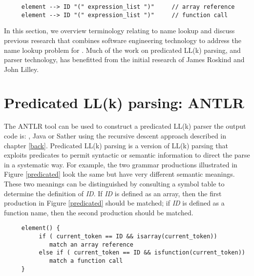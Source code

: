 
\begin{figure*}[b]
\figline
 \caption{{\em Sample Grammar}.}
\singlespace
\begin{verbatim}
     element --> ID "(" expression_list ")"     // array reference
     element --> ID "(" expression_list ")"     // function call
\end{verbatim}
\doublespace
   \label{predicated}
\end{figure*}



In this section,
we overview terminology relating to name lookup
and discuss previous research that combines software
engineering technology to address the name lookup
problem for {\CPP}\cite{powertools}.
Much of the work on predicated LL(k) parsing,
and {\CPP} parser technology, has benefitted from
the initial research of James Roskind and
John Lilley\cite{lilley97,Roskind89}.


\section{Predicated LL(k) parsing: ANTLR}

The ANTLR tool can be used to construct a predicated LL(k) parser
the output code is: {\CPP}, Java or Sather using the recursive descent
approach described in chapter \ref{back}.
Predicated LL(k) parsing is a version of LL(k) parsing
that exploits predicates to permit syntactic or semantic
information to direct the parse in a systematic way.
For example, the two grammar productions illustrated in
Figure \ref{predicated} look the same but have very
different semantic meanings. These two meanings can
be distinguished by consulting a symbol table to determine
the definition of {\em ID}.
If {\em ID} is defined as an array, then the first production
in Figure \ref{predicated} should be matched;
if {\em ID} is defined as a function name, then the second production
should be matched.

\begin{figure*}[t]
\singlespace  
\begin{verbatim}
     element() {
          if ( current_token == ID && isarray(current_token))
             match an array reference
          else if ( current_token == ID && isfunction(current_token))
             match a function call
     }
\end{verbatim}
   \caption{{\em Predicated LL(k) parsing}.}
\figline  
\doublespace
\label{semanticpred}
\end{figure*}

